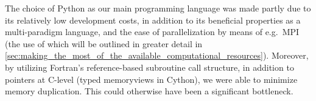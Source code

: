 The choice of Python as our main programming language was made partly due to
its relatively low development costs, in addition to its beneficial properties
as a multi-paradigm language, and the ease of parallelization by means of e.g.\
MPI (the use of which will be outlined in greater detail in
\cref{sec:making_the_most_of_the_available_computational_resources}). Moreover,
by utilizing Fortran's reference-based subroutine call structure, in addition
to pointers at C-level (typed memoryviews in Cython), we were able to minimize
memory duplication. This could otherwise have been a significant bottleneck.

